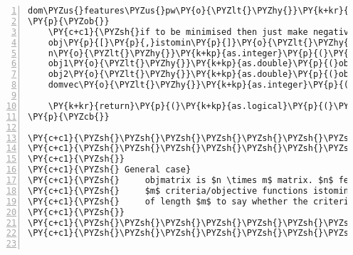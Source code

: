 \begin{Verbatim}[commandchars=\\\{\},codes={\catcode`\$=3\catcode`\^=7\catcode`\_=8},gobble=0,numbers=left,fontfamily=fvm,fontshape=n,fontsize=\footnotesize,tabsize=2]
dom\PYZus{}features\PYZus{}pw\PY{o}{\PYZlt{}\PYZhy{}}\PY{k+kr}{function}\PY{p}{(}obj\PY{p}{,}istomin\PY{p}{)}
\PY{p}{\PYZob{}}
	\PY{c+c1}{\PYZsh{}if to be minimised then just make negative and maximise}
	obj\PY{p}{[}\PY{p}{,}istomin\PY{p}{]}\PY{o}{\PYZlt{}\PYZhy{}} \PY{o}{\PYZhy{}}obj\PY{p}{[}\PY{p}{,}istomin\PY{p}{]} 
	n\PY{o}{\PYZlt{}\PYZhy{}}\PY{k+kp}{as.integer}\PY{p}{(}\PY{k+kp}{nrow}\PY{p}{(}obj\PY{p}{)}\PY{p}{)}
	obj1\PY{o}{\PYZlt{}\PYZhy{}}\PY{k+kp}{as.double}\PY{p}{(}obj\PY{p}{[}\PY{p}{,}\PY{l+m}{1}\PY{p}{]}\PY{p}{)}
	obj2\PY{o}{\PYZlt{}\PYZhy{}}\PY{k+kp}{as.double}\PY{p}{(}obj\PY{p}{[}\PY{p}{,}\PY{l+m}{2}\PY{p}{]}\PY{p}{)}
	domvec\PY{o}{\PYZlt{}\PYZhy{}}\PY{k+kp}{as.integer}\PY{p}{(}\PY{k+kp}{rep}\PY{p}{(}\PY{l+m}{0}\PY{p}{,}n\PY{p}{)}\PY{p}{)} \PY{c+c1}{\PYZsh{}output vector}
	
	\PY{k+kr}{return}\PY{p}{(}\PY{k+kp}{as.logical}\PY{p}{(}\PY{l+m}{.}C\PY{p}{(}\PY{l+s}{\PYZdq{}}\PY{l+s}{dom\PYZus{}feat\PYZdq{}}\PY{p}{,}n\PY{p}{,}obj1\PY{p}{,}obj2\PY{p}{,}domvec\PY{p}{)}\PY{p}{[[}\PY{l+m}{4}\PY{p}{]]}\PY{p}{)}\PY{p}{)}
\PY{p}{\PYZcb{}}
	
\PY{c+c1}{\PYZsh{}\PYZsh{}\PYZsh{}\PYZsh{}\PYZsh{}\PYZsh{}\PYZsh{}\PYZsh{}\PYZsh{}\PYZsh{}\PYZsh{}\PYZsh{}\PYZsh{}\PYZsh{}\PYZsh{}\PYZsh{}\PYZsh{}\PYZsh{}\PYZsh{}\PYZsh{}\PYZsh{}\PYZsh{}\PYZsh{}\PYZsh{}\PYZsh{}\PYZsh{}\PYZsh{}\PYZsh{}\PYZsh{}\PYZsh{}\PYZsh{}\PYZsh{}\PYZsh{}\PYZsh{}\PYZsh{}\PYZsh{}\PYZsh{}\PYZsh{}\PYZsh{}\PYZsh{}\PYZsh{}\PYZsh{}}
\PY{c+c1}{\PYZsh{}\PYZsh{}\PYZsh{}\PYZsh{}\PYZsh{}\PYZsh{}\PYZsh{}\PYZsh{}\PYZsh{}\PYZsh{}\PYZsh{}\PYZsh{}\PYZsh{}\PYZsh{}\PYZsh{}\PYZsh{}\PYZsh{}\PYZsh{}\PYZsh{}\PYZsh{}\PYZsh{}\PYZsh{}\PYZsh{}\PYZsh{}\PYZsh{}\PYZsh{}\PYZsh{}\PYZsh{}\PYZsh{}\PYZsh{}\PYZsh{}\PYZsh{}\PYZsh{}\PYZsh{}\PYZsh{}\PYZsh{}\PYZsh{}\PYZsh{}\PYZsh{}\PYZsh{}\PYZsh{}\PYZsh{}}
\PY{c+c1}{\PYZsh{}}
\PY{c+c1}{\PYZsh{} General case}
\PY{c+c1}{\PYZsh{}     objmatrix is $n \times m$ matrix. $n$ features/observations and }
\PY{c+c1}{\PYZsh{}     $m$ criteria/objective functions istominvec is a boolean vec}
\PY{c+c1}{\PYZsh{}     of length $m$ to say whether the criteria are to be minimised}
\PY{c+c1}{\PYZsh{}}
\PY{c+c1}{\PYZsh{}\PYZsh{}\PYZsh{}\PYZsh{}\PYZsh{}\PYZsh{}\PYZsh{}\PYZsh{}\PYZsh{}\PYZsh{}\PYZsh{}\PYZsh{}\PYZsh{}\PYZsh{}\PYZsh{}\PYZsh{}\PYZsh{}\PYZsh{}\PYZsh{}\PYZsh{}\PYZsh{}\PYZsh{}\PYZsh{}\PYZsh{}\PYZsh{}\PYZsh{}\PYZsh{}\PYZsh{}\PYZsh{}\PYZsh{}\PYZsh{}\PYZsh{}\PYZsh{}\PYZsh{}\PYZsh{}\PYZsh{}\PYZsh{}\PYZsh{}\PYZsh{}\PYZsh{}\PYZsh{}\PYZsh{}}
\PY{c+c1}{\PYZsh{}\PYZsh{}\PYZsh{}\PYZsh{}\PYZsh{}\PYZsh{}\PYZsh{}\PYZsh{}\PYZsh{}\PYZsh{}\PYZsh{}\PYZsh{}\PYZsh{}\PYZsh{}\PYZsh{}\PYZsh{}\PYZsh{}\PYZsh{}\PYZsh{}\PYZsh{}\PYZsh{}\PYZsh{}\PYZsh{}\PYZsh{}\PYZsh{}\PYZsh{}\PYZsh{}\PYZsh{}\PYZsh{}\PYZsh{}\PYZsh{}\PYZsh{}\PYZsh{}\PYZsh{}\PYZsh{}\PYZsh{}\PYZsh{}\PYZsh{}\PYZsh{}\PYZsh{}\PYZsh{}\PYZsh{}}


\end{Verbatim}
